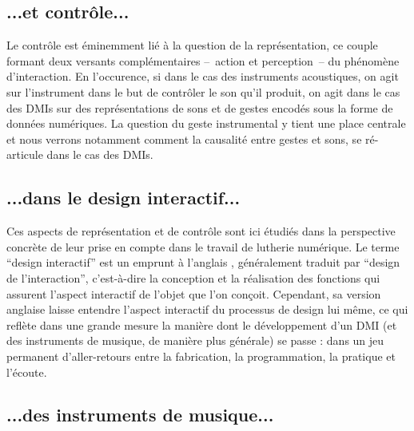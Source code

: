 \subsection*{...et contrôle...}

\noindent Le contrôle est éminemment lié à la question de la représentation, ce couple formant deux versants complémentaires --~action et perception~-- du phénomène d'interaction. En l'occurence, si dans le cas des instruments acoustiques, on agit sur l'instrument dans le but de contrôler le son qu'il produit, on agit dans le cas des \glspl{DMI} sur des représentations de sons et de gestes encodés sous la forme de données numériques. La question du geste instrumental y tient une place centrale et nous verrons notamment comment la causalité entre gestes et sons, se ré-articule dans le cas des \glspl{DMI}.

\subsection*{...dans le design interactif...}

\noindent Ces aspects de représentation et de contrôle sont ici étudiés dans la perspective concrète de leur prise en compte dans le travail de lutherie numérique. Le terme ``design interactif'' est un emprunt à l'anglais , généralement traduit par ``design de l'interaction'', c'est-à-dire la conception et la réalisation des fonctions qui assurent l'aspect interactif de l'objet que l'on conçoit. Cependant, sa version anglaise laisse entendre l'aspect interactif du processus de design lui même, ce qui reflète dans une grande mesure la manière dont le développement d'un \gls{DMI} (et des instruments de musique, de manière plus générale) se passe : dans un jeu permanent d'aller-retours entre la fabrication, la programmation, la pratique et l'écoute.

\subsection*{...des instruments de musique...}

